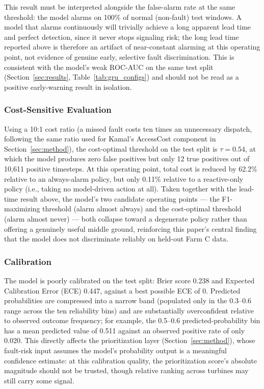 \documentclass[conference]{IEEEtran}
\begin{document}
This result must be interpreted alongside the false-alarm rate at the
same threshold: the model alarms on 100\% of normal (non-fault) test
windows. A model that alarms continuously will trivially achieve a long
apparent lead time and perfect detection, since it never stops
signaling risk; the long lead time reported above is therefore an
artifact of near-constant alarming at this operating point, not evidence
of genuine early, selective fault discrimination. This is consistent
with the model's weak ROC-AUC on the same test split
(Section~\ref{sec:results}, Table~\ref{tab:gru_configs}) and should not
be read as a positive early-warning result in isolation.
 
\subsubsection{Cost-Sensitive Evaluation}
 
Using a 10:1 cost ratio (a missed fault costs ten times an unnecessary
dispatch, following the same ratio used for Kamal's AccessCost
component in Section~\ref{sec:method}), the cost-optimal threshold on
the test split is $\tau = 0.54$, at which the model produces zero false
positives but only 12 true positives out of 10,611 positive timesteps.
At this operating point, total cost is reduced by 62.2\% relative to an
always-alarm policy, but only 0.11\% relative to a reactive-only
policy (i.e., taking no model-driven action at all). Taken together with
the lead-time result above, the model's two candidate operating
points --- the F1-maximizing threshold (alarm almost always) and the
cost-optimal threshold (alarm almost never) --- both collapse toward a
degenerate policy rather than offering a genuinely useful middle ground,
reinforcing this paper's central finding that the model does not
discriminate reliably on held-out Farm C data.
 
\subsubsection{Calibration}
 
The model is poorly calibrated on the test split: Brier score 0.238 and
Expected Calibration Error (ECE) 0.447, against a best possible ECE of
0. Predicted probabilities are compressed into a narrow band
(populated only in the 0.3--0.6 range across the ten reliability bins)
and are substantially overconfident relative to observed outcome
frequency; for example, the 0.5--0.6 predicted-probability bin has a
mean predicted value of 0.511 against an observed positive rate of only
0.020. This directly affects the prioritization layer
(Section~\ref{sec:method}), whose fault-risk input assumes the model's
probability output is a meaningful confidence estimate: at this
calibration quality, the prioritization score's absolute magnitude
should not be trusted, though relative ranking across turbines may
still carry some signal.
 
\end{document}
